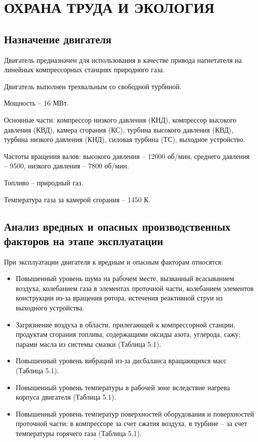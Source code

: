 \section{ОХРАНА ТРУДА И ЭКОЛОГИЯ}
\label{sec:ecology} 

\subsection{Назначение двигателя} 
 \label{sub:ecology_engine_purpose} 

Двигатель предназначен для использования в качестве привода нагнетателя на линейных компрессорных станциях природного газа.

Двигатель выполнен трехвальным со свободной турбиной. 

Мощность – 16 МВт.

Основные части: компрессор низкого давления (КНД), компрессор высокого давления (КВД), камера сгорания (КС), турбина высокого давления (КВД), турбина низкого давления (КНД), силовая турбина (ТС), выходное устройство.

Частоты вращения валов: высокого давления – 12000 об/мин, среднего давления – 9500, низкого давления – 7800 об/мин.

Топливо – природный газ.

Температура газа за камерой сгорания – 1450 К.

\subsection{Анализ вредных и опасных производственных факторов на этапе эксплуатации} %
 \label{sub:ecology_factor_analisys} 

При эксплуатации двигателя к вредным и опасным факторам относятся:
\begin{itemize}
	\item Повышенный уровень шума на рабочем месте, вызванный всасыванием воздуха, колебанием газа в элементах проточной части, колебанием элементов конструкции из-за вращения ротора, истечения реактивной струи из выходного устройства.
	\item Загрязнение воздуха в области, прилегающей к компрессорной станции, продуктам сгорания топлива, содержащими оксиды азота, углерода, сажу; парами масла из системы смазки (Таблица 5.1).
	\item Повышенный уровень вибраций из-за дисбаланса вращающихся масс (Таблица 5.1).
	\item Повышенный уровень температуры в рабочей зоне вследствие нагрева корпуса двигателя (Таблица 5.1).
	\item Повышенный уровень температур поверхностей оборудования и поверхностей проточной части: в компрессоре за счет сжатия воздуха, в турбине – за счет температуры горячего газа (Таблица 5.1). 
\end{itemize}

